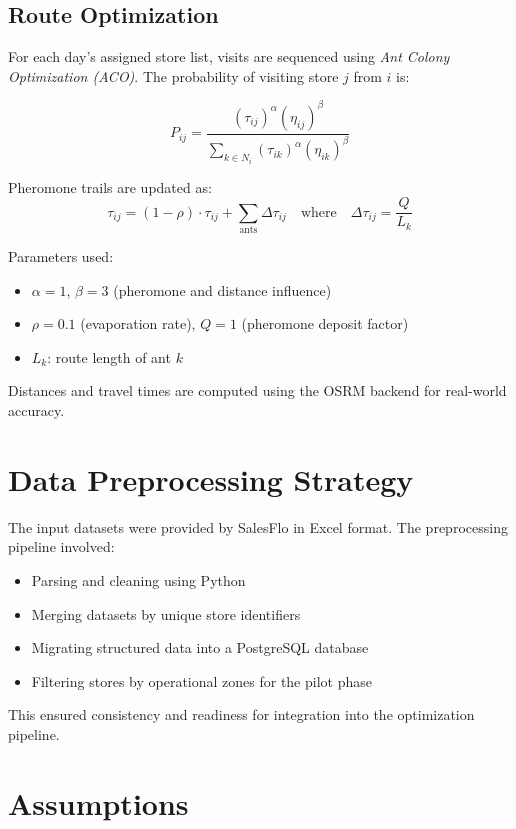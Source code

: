 \subsection{Route Optimization}

For each day’s assigned store list, visits are sequenced using \textit{Ant Colony Optimization (ACO)}. The probability of visiting store $j$ from $i$ is:

\[
P_{ij} = \frac{(\tau_{ij})^\alpha (\eta_{ij})^\beta}{\sum_{k \in N_i} (\tau_{ik})^\alpha (\eta_{ik})^\beta}
\]

Pheromone trails are updated as:
\[
\tau_{ij} = (1 - \rho) \cdot \tau_{ij} + \sum_{\text{ants}} \Delta \tau_{ij} \quad \text{where} \quad \Delta \tau_{ij} = \frac{Q}{L_k}
\]


\noindent Parameters used:
\begin{itemize}
  \item $\alpha = 1$, $\beta = 3$ (pheromone and distance influence)
  \item $\rho = 0.1$ (evaporation rate), $Q = 1$ (pheromone deposit factor)
  \item $L_k$: route length of ant $k$
\end{itemize}

Distances and travel times are computed using the OSRM backend for real-world accuracy.

\section{Data Preprocessing Strategy}

The input datasets were provided by SalesFlo in Excel format. The preprocessing pipeline involved:

\begin{itemize}
  \item Parsing and cleaning using Python
  \item Merging datasets by unique store identifiers
  \item Migrating structured data into a PostgreSQL database
  \item Filtering stores by operational zones for the pilot phase
\end{itemize}

This ensured consistency and readiness for integration into the optimization pipeline.

\section{Assumptions}

